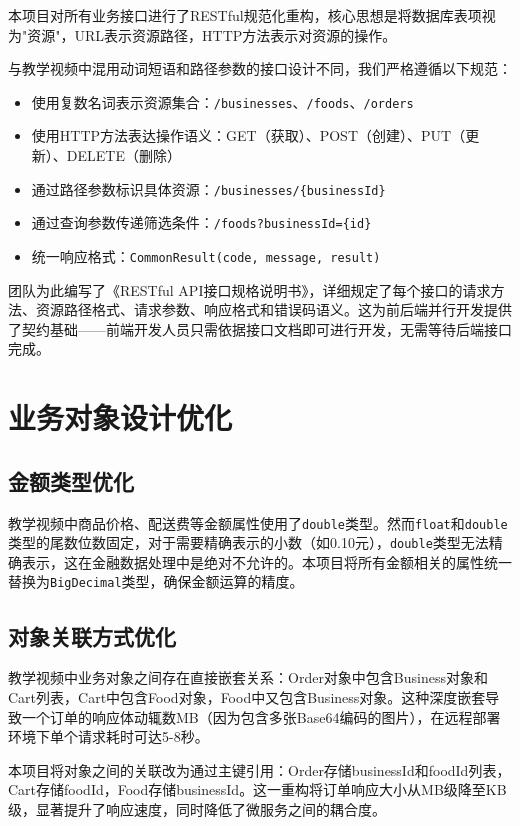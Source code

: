 本项目对所有业务接口进行了RESTful规范化重构，核心思想是将数据库表项视为"资源"，URL表示资源路径，HTTP方法表示对资源的操作。

与教学视频中混用动词短语和路径参数的接口设计不同，我们严格遵循以下规范：

\begin{itemize}
	\item 使用复数名词表示资源集合：\verb|/businesses|、\verb|/foods|、\verb|/orders|
	\item 使用HTTP方法表达操作语义：GET（获取）、POST（创建）、PUT（更新）、DELETE（删除）
	\item 通过路径参数标识具体资源：\verb|/businesses/{businessId}|
	\item 通过查询参数传递筛选条件：\verb|/foods?businessId={id}|
	\item 统一响应格式：\verb|CommonResult(code, message, result)|
\end{itemize}

团队为此编写了《RESTful API接口规格说明书》，详细规定了每个接口的请求方法、资源路径格式、请求参数、响应格式和错误码语义。这为前后端并行开发提供了契约基础——前端开发人员只需依据接口文档即可进行开发，无需等待后端接口完成。

\section{业务对象设计优化}

\subsection{金额类型优化}

教学视频中商品价格、配送费等金额属性使用了\verb|double|类型。然而\verb|float|和\verb|double|类型的尾数位数固定，对于需要精确表示的小数（如0.10元），\verb|double|类型无法精确表示，这在金融数据处理中是绝对不允许的。本项目将所有金额相关的属性统一替换为\verb|BigDecimal|类型，确保金额运算的精度。

\subsection{对象关联方式优化}

教学视频中业务对象之间存在直接嵌套关系：Order对象中包含Business对象和Cart列表，Cart中包含Food对象，Food中又包含Business对象。这种深度嵌套导致一个订单的响应体动辄数MB（因为包含多张Base64编码的图片），在远程部署环境下单个请求耗时可达5-8秒。

本项目将对象之间的关联改为通过主键引用：Order存储businessId和foodId列表，Cart存储foodId，Food存储businessId。这一重构将订单响应大小从MB级降至KB级，显著提升了响应速度，同时降低了微服务之间的耦合度。
